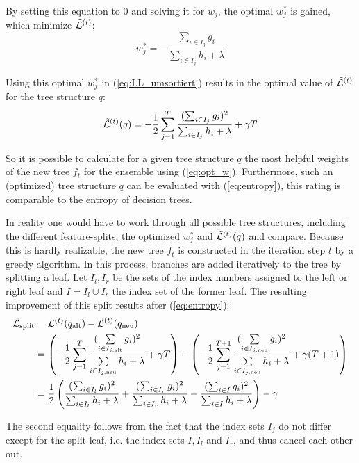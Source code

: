 By setting this equation to $0$ and solving it for $w_j$, the optimal $w^*_j$ is gained, which minimize $\tilde{\mathcal{L}}^{(t)}$:
\begin{equation} \label{eq:opt_w}
w_j^* = - \frac{\sum_{i \in I_j} g_i}{\sum_{i \in I_j} h_i + \lambda}
\end{equation}

Using this optimal $w_j^*$ in (\ref{eq:LL_umsortiert}) results in the optimal value of $\tilde{\mathcal{L}}^{(t)}$ for the tree structure $q$:
\begin{equation} \label{eq:entropy}
\tilde{\mathcal{L}}^{(t)} (q) = - \frac{1}{2} \sum_{j=1}^{T} \frac{(\sum_{i \in I_j} g_i)^2}{\sum_{i \in I_j} h_i + \lambda} + \gamma T
\end{equation}

So it is possible to calculate for a given tree structure $q$ the most helpful weights of the new tree $f_t$ for the ensemble using (\ref{eq:opt_w}). Furthermore, such an (optimized) tree structure $q$ can be evaluated with (\ref{eq:entropy}), this rating is comparable to the entropy of decision trees. 

In reality one would have to work through all possible tree structures, including the different feature-splits, the optimized $w^*_j$ and $\tilde{\mathcal{L}}^{(t)} (q)$ and compare. Because this is hardly realizable, the new tree $f_t$ is constructed in the iteration step $t$ by a greedy algorithm. In this process, branches are added iteratively to the tree by splitting a leaf. Let $I_l, I_r$ be the sets of the index numbers assigned to the left or right leaf and $I = I_l \dot\cup I_r$ the index set of the former leaf. The resulting improvement of this split results after (\ref{eq:entropy}):
\begin{equation} \label{eq:LRsplit}
	\begin{split}
		\tilde{\mathcal{L}}_\text{split} &= \tilde{\mathcal{L}}^{(t)} (q_\text{alt})-\tilde{\mathcal{L}}^{(t)} (q_\text{neu})\\
		&= \left( - \frac{1}{2} \sum_{j=1}^{T} \frac{(\sum\limits_{i \in I_{j, \text{alt}}} g_i)^2}{\sum\limits_{i \in I_{j, \text{neu}}} h_i + \lambda} + \gamma T \right)- \left( - \frac{1}{2} \sum_{j=1}^{T+1} \frac{(\sum\limits_{i \in I_{j, \text{neu}}} g_i)^2}{\sum\limits_{i \in I_{j, \text{neu}}} h_i + \lambda} + \gamma (T+1) \right)\\	
		&= \frac{1}{2} \left( \frac{(\sum_{i \in I_l} g_i)^2}{\sum_{i \in I_l} h_i + \lambda} + \frac{(\sum_{i \in I_r} g_i)^2}{\sum_{i \in I_r} h_i + \lambda} - \frac{(\sum_{i \in I} g_i)^2}{\sum_{i \in I} h_i + \lambda} \right) - \gamma 
	\end{split}
\end{equation}

The second equality follows from the fact that the index sets $I_j$ do not differ except for the split leaf, i.e. the index sets $I, I_l$ and $I_r$, and thus cancel each other out.


